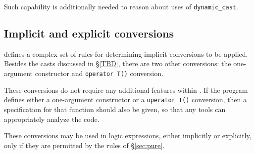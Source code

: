 Such capability is additionally needed to reason about uses of \lstinline|dynamic_cast|.

\subsection{Implicit and explicit conversions}

\lang{} defines a complex set of rules for determining implicit conversions to be applied. Besides the casts discussed in \S\ref{TBD}, there are two other conversions: the one-argument constructor and \lstinline|operator T()| conversion. 

These conversions do not require any additional features within 
\NAME{}. If the program defines either a one-argument constructor or a
\lstinline|operator T()| conversion, then a specification for that
function should also be given, so that any \NAME{} tools can appropriately analyze the code.

These conversions may be used in logic expressions, either implicitly or explicitly, only if they are permitted by the rules of \S\ref{sec:pure}. 


